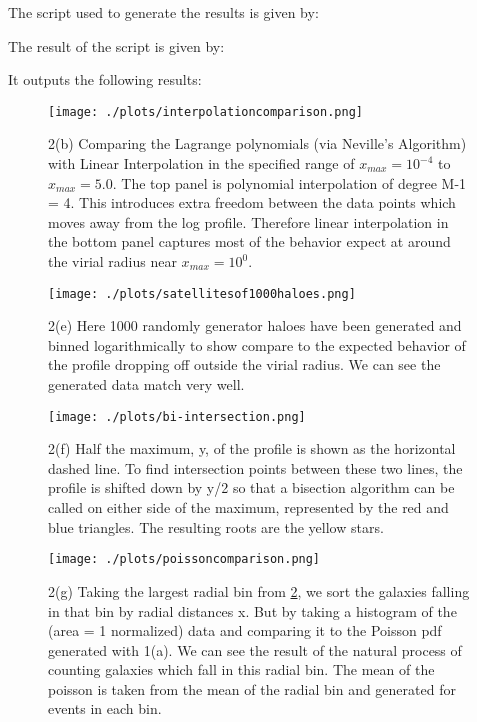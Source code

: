 
The script used to generate the results is given by:



The result of the script is given by:

It outputs the following results:



\begin{figure}[!htb]
  \centering
  \texttt{[image: ./plots/interpolationcomparison.png]}
  \caption{2(b) Comparing the Lagrange polynomials (via Neville's Algorithm) with Linear Interpolation in the specified range of $x_{max} = 10^{-4}$ to $x_{max} = 5.0$. The top panel is polynomial interpolation of degree M-1 = 4. This introduces extra freedom between the data points which moves away from the log profile. Therefore linear interpolation in the bottom panel captures most of the behavior expect at around the virial radius near $x_{max} = 10^{0}$. }
  \label{fig:interpcompare}
\end{figure}

\begin{figure}[!htb]
  \centering
  \texttt{[image: ./plots/satellitesof1000haloes.png]}
  \caption{2(e) Here 1000 randomly generator haloes have been generated and binned logarithmically to show compare to the expected behavior of the profile dropping off outside the virial radius. We can see the generated data match very well.}
  \label{fig:1000haloes}
\end{figure}


\begin{figure}[!htb]
  \centering
  \texttt{[image: ./plots/bi-intersection.png]}
  \caption{2(f) Half the maximum, y, of the profile is shown as the horizontal dashed line. To find intersection points between these two lines, the profile is shifted down by y/2 so that a bisection algorithm can be called on either side of the maximum, represented by the red and blue triangles. The resulting roots are the yellow stars.}
  \label{fig:intersection}
\end{figure}


\begin{figure}[!htb]
  \centering
  \texttt{[image: ./plots/poissoncomparison.png]}
  \caption{2(g) Taking the largest radial bin from \ref{fig:1000haloes}, we sort the galaxies falling in that bin by radial distances x. But by taking a histogram of the (area = 1 normalized) data and comparing it to the Poisson pdf generated with 1(a). We can see the result of the natural process of counting galaxies which fall in this radial bin. The mean of the poisson is taken from the mean of the radial bin and generated for events in each bin.}
  \label{fig:comppoisson}
\end{figure}



